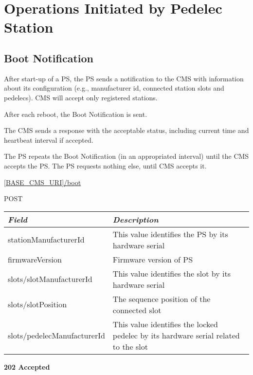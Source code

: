 \section{Operations Initiated by Pedelec Station}

\subsection{Boot Notification}

After start-up of a \acs{PS}, the \acs{PS} sends a notification to the \acs{CMS} with information about its configuration (e.g., manufacturer id, connected station slots and pedelecs). \acs{CMS} will accept only registered stations. 

After each reboot, the Boot Notification is sent.

The \acs{CMS} sends a response with the acceptable status, including current time and heartbeat interval if accepted.

The \acs{PS} repeats the Boot Notification (in an appropriated interval) until the \acs{CMS} accepts the \acs{PS}. The \acs{PS} requests nothing else, until \acs{CMS} accepts it.


 \url{[BASE_CMS_URI]/boot}

 POST

\begin{table}[!h]
\vspace{-7mm}
\begin{tabularx}{\linewidth}{ | l | X | }
  \hline
  \textit{Field} & \textit{Description} \\
  \hline \hline
  stationManufacturerId 		& This value identifies the \acs{PS} by its hardware serial \\
  firmwareVersion			& Firmware version of \acs{PS}\\
  slots/slotManufacturerId 	& This value identifies the slot by its hardware serial \\
  slots/slotPosition			& The sequence position of the connected slot \\
  slots/pedelecManufacturerId & This value identifies the locked pedelec by its hardware serial related to the slot \\
    \hline
\end{tabularx}
\end{table}

\textbf{202 Accepted}

